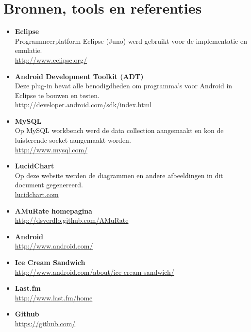 \documentclass[11pt,a4paper]{article}
\begin{document}
\newpage	
\section{Bronnen, tools en referenties}
	\label{sec:Bronnen}

	\begin{itemize}
		
	\item \textbf{Eclipse} \\
	Programmeerplatform Eclipse (Juno) werd gebruikt voor de implementatie en emulatie.	\\
	\url{http://www.eclipse.org/}

	\item \textbf{Android Development Toolkit (ADT)} \\
	Deze plug-in bevat alle benodigdheden om programma's voor Android in Eclipse te bouwen en testen.\\
	\url{http://developer.android.com/sdk/index.html}
	
	\item \textbf{MySQL} \\
	Op MySQL workbench werd de data collection aangemaakt en kon de luisterende socket aangemaakt worden. \\
	\url{http://www.mysql.com/}	
	
	\item \textbf{LucidChart} \\
	Op deze website werden de diagrammen en andere afbeeldingen in dit document gegenereerd.\\
	\url{lucidchart.com}
	
	\item \textbf{AMuRate homepagina} \\
		\url{http://dsverdlo.github.com/AMuRate}
		
	\item \textbf{Android} \\
		\url{http://www.android.com/}
		
	\item \textbf{Ice Cream Sandwich} \\
		\url{http://www.android.com/about/ice-cream-sandwich/}	
		
	\item \textbf{Last.fm} \\
		\url{http://www.last.fm/home}	
		
	\item \textbf{Github} \\
		\url{https://github.com/}



	\end{itemize}
\end{document}
